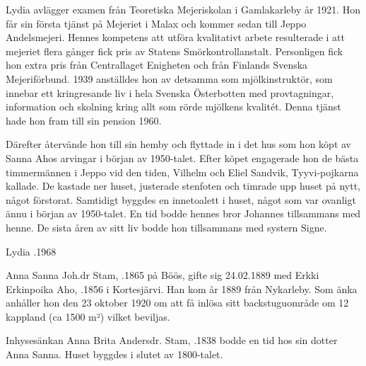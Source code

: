 Lydia avlägger examen från Teoretiska Mejeriskolan i Gamlakarleby år 1921. Hon får sin första tjänst på Mejeriet i Malax och kommer sedan till Jeppo Andelsmejeri. Hennes kompetens att utföra kvalitativt arbete resulterade i att mejeriet flera gånger fick pris av Statens Smörkontrollanstalt. Personligen fick hon extra pris från Centrallaget Enigheten och från Finlands Svenska Mejeriförbund. 1939 anställdes hon av detsamma som mjölkinstruktör, som innebar ett kringresande liv i hela Svenska Österbotten med provtagningar, information och skolning kring allt som rörde mjölkens kvalitét. Denna tjänst hade hon fram till sin pension 1960.

Därefter återvände hon till sin hemby och flyttade in i det hus som hon köpt av Sanna Ahos arvingar i början av 1950-talet. Efter köpet engagerade hon de bästa timmermännen i Jeppo vid den tiden, Vilhelm och Eliel Sandvik, Tyyvi-pojkarna kallade. De kastade ner huset, justerade stenfoten och timrade upp huset på nytt, något förstorat. Samtidigt byggdes en innetoalett i huset, något som var ovanligt ännu i början av 1950-talet. En tid bodde hennes bror Johannes tillsammans med henne. De sista åren av sitt liv bodde hon tillsammans med systern Signe.

Lydia .1968


Anna Sanna Joh.dr Stam, .1865 på Böös, gifte sig 24.02.1889 med Erkki Erkinpoika Aho, .1856 i Kortesjärvi. Han kom år 1889 från Nykarleby. Som änka anhåller hon den 23 oktober 1920 om att få inlösa sitt backstuguområde om 12 kappland (ca 1500 m²) vilket beviljas.
\begin{jhchildren}
  \item {}
  \item {}
  \item {}
  \item {}
\end{jhchildren}

Inhysesänkan Anna Brita Andersdr. Stam, .1838 bodde en tid hos sin dotter Anna Sanna. Huset byggdes i slutet av 1800-talet.





